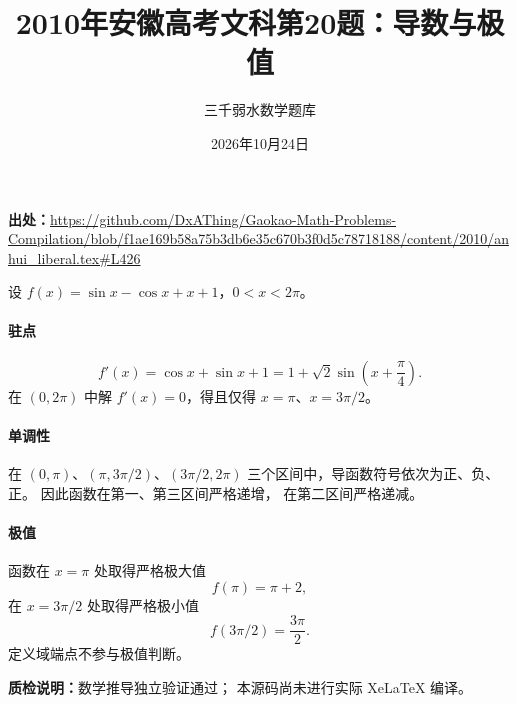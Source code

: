 \documentclass[UTF8,a4paper,11pt]{ctexart}
\title{2010年安徽高考文科第20题：导数与极值}
\author{三千弱水数学题库}
\date{2026年10月24日}
\begin{document}
\maketitle
\noindent\textbf{出处：}\url{https://github.com/DxAThing/Gaokao-Math-Problems-Compilation/blob/f1ae169b58a75b3db6e35c670b3f0d5c78718188/content/2010/anhui_liberal.tex#L426}

设 $f(x)=\sin x-\cos x+x+1$，$0<x<2\pi$。

\paragraph{驻点}
\[
f'(x)=\cos x+\sin x+1
     =1+\sqrt{2}\sin\left(x+\frac{\pi}{4}\right).
\]
在 $(0,2\pi)$ 中解 $f'(x)=0$，得且仅得
$x=\pi$、$x=3\pi/2$。

\paragraph{单调性}
在 $(0,\pi)$、$(\pi,3\pi/2)$、$(3\pi/2,2\pi)$
三个区间中，导函数符号依次为正、负、正。
因此函数在第一、第三区间严格递增，
在第二区间严格递减。

\paragraph{极值}
函数在 $x=\pi$ 处取得严格极大值
\[
f(\pi)=\pi+2,
\]
在 $x=3\pi/2$ 处取得严格极小值
\[
f(3\pi/2)=\frac{3\pi}{2}.
\]
定义域端点不参与极值判断。

\bigskip
\noindent\textbf{质检说明：}数学推导独立验证通过；
本源码尚未进行实际 XeLaTeX 编译。
\end{document}
